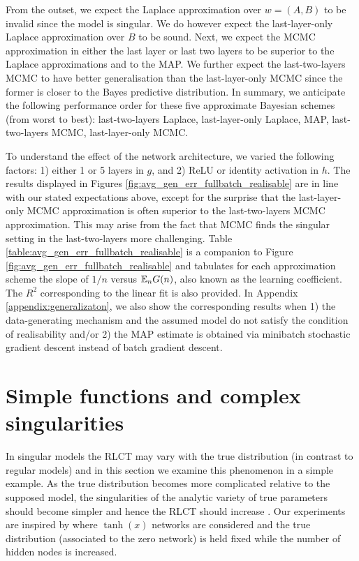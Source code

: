 \documentclass{article} %
\begin{document}
From the outset, we expect the Laplace approximation over $w = (A, B)$ to be invalid since the model is singular. We do however expect the last-layer-only Laplace approximation over $B$ to be sound. Next, we expect the MCMC approximation in either the last layer or last two layers to be  superior to the Laplace approximations and to the MAP. We further expect the last-two-layers MCMC to have better generalisation than the last-layer-only MCMC since the former is closer to the Bayes predictive distribution. In summary, we anticipate the following performance order for these five approximate Bayesian schemes (from worst to best): last-two-layers Laplace, last-layer-only Laplace, MAP, last-two-layers MCMC, last-layer-only MCMC.


To understand the effect of the network architecture, we varied the following factors:  1) either 1 or 5 layers in $g$, and 2) ReLU or identity activation in $h$.
The results displayed in Figures \ref{fig:avg_gen_err_fullbatch_realisable} are in line with our stated expectations above, except for the surprise that the last-layer-only MCMC approximation is often superior to the last-two-layers MCMC approximation. This may arise from the fact that MCMC finds the singular setting in the last-two-layers more challenging. Table \ref{table:avg_gen_err_fullbatch_realisable} is a companion to Figure \ref{fig:avg_gen_err_fullbatch_realisable} and tabulates for each approximation scheme the slope of $1/n$ versus ${\mathbb{E}}_n G(n)$, also known as the learning coefficient. The $R^2$ corresponding to the linear fit is also provided. 
In Appendix \ref{appendix:generalizaton}, we also show the corresponding results when 1) the data-generating mechanism and the assumed model do not satisfy the condition of realisability and/or 2) the MAP estimate is obtained via minibatch stochastic gradient descent instead of batch gradient descent. 



\section{Simple functions and complex singularities}\label{section:simple_func}

In singular models the RLCT may vary with the true distribution (in contrast to regular models) and in this section we examine this phenomenon in a simple example. As the true distribution becomes more complicated relative to the supposed model, the singularities of the analytic variety of true parameters should become simpler and hence the RLCT should increase \citep[\S 7.6]{watanabe_algebraic_2009}. Our experiments are inspired by \citep[\S 7.2]{watanabe_algebraic_2009} where $\operatorname{tanh}(x)$ networks are considered and the true distribution (associated to the zero network) is held fixed while the number of hidden nodes is increased.
\end{document}
